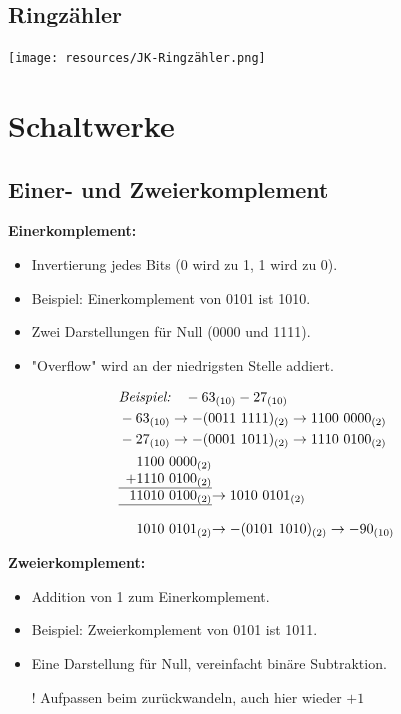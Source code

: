 \documentclass[a4paper,6pt]{article}
\begin{document}
\begin{multicols*}{3}
\subsection*{Ringzähler}

\begin{center}
    \texttt{[image: resources/JK-Ringzähler.png]}
\end{center}

\section{Schaltwerke}

\subsection*{Einer- und Zweierkomplement}

\textbf{Einerkomplement:}
\begin{itemize}
    \item Invertierung jedes Bits (0 wird zu 1, 1 wird zu 0).
    \item Beispiel: Einerkomplement von 0101 ist 1010.
    \item Zwei Darstellungen für Null (0000 und 1111).
    \item "Overflow" wird an der niedrigsten Stelle addiert.
\end{itemize}

\begin{align*}
    & \textit{Beispiel:} \quad -63_{(10)} - 27_{(10)} \\
    & -63_{(10)} \rightarrow  -(0011\ 1111)_{(2)} \rightarrow 1100\ 0000_{(2)} \\
    & -27_{(10)} \rightarrow  -(0001\ 1011)_{(2)} \rightarrow 1110\ 0100_{(2)} \\
    & \begin{array}{r@{}c@{}l}
        &1100\ 0000_{(2)} & \\
        +&1110\ 0100_{(2)} & \\
        \cline{1-2}
        1&1010\ 0100_{(2)} & \rightarrow 1010\ 0101_{(2)} \\
        \cline{1-2}
        \\
        &1010\ 0101_{(2)} & \rightarrow -(0101\ 1010)_{(2)} \rightarrow -90_{(10)}
    \end{array}
\end{align*}

\textbf{Zweierkomplement:}
\begin{itemize}
    \item Addition von 1 zum Einerkomplement.
    \item Beispiel: Zweierkomplement von 0101 ist 1011.
    \item Eine Darstellung für Null, vereinfacht binäre Subtraktion.
    \item[!] Aufpassen beim zurückwandeln, auch hier wieder $+1$ 
\end{itemize}



\end{multicols*}
\end{document}
